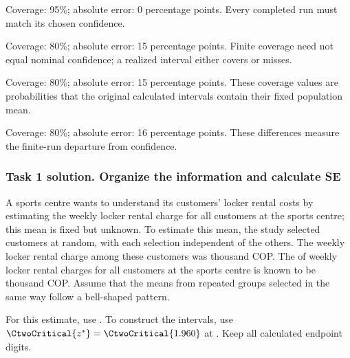 \clearpage
{}
\begin{answeroptions}
\item Coverage: 95\%; absolute error: 0 percentage points. Every completed run must match its chosen confidence.
\item Coverage: 80\%; absolute error: 15 percentage points. Finite coverage need not equal nominal confidence; a realized interval either covers or misses.
\item Coverage: 80\%; absolute error: 15 percentage points. These coverage values are probabilities that the original calculated intervals contain their fixed population mean.
\item Coverage: 80\%; absolute error: 16 percentage points. These differences measure the finite-run departure from confidence.
\end{answeroptions}
\clearpage
\subsubsection*{Task 1 solution. Organize the information and calculate SE}
\label{sol:c2-1-a}
A sports centre wants to understand its customers' locker rental costs by estimating the  weekly locker rental charge for all customers at the sports centre; this mean is fixed but unknown. To estimate this mean, the study selected  customers at random, with each selection independent of the others. The  weekly locker rental charge among these  customers was  thousand COP. The  of weekly locker rental charges for all customers at the sports centre is known to be  thousand COP. Assume that the means from repeated groups selected in the same way follow a bell-shaped pattern.

For this estimate, use  . To construct the intervals, use $\CtwoCritical{z^*}=\CtwoCritical{1.960}$ at . Keep all calculated endpoint digits.

